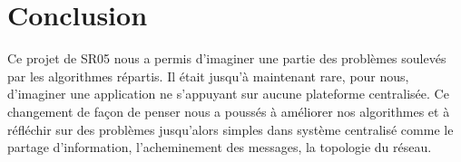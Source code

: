 \section{Conclusion}
Ce projet de SR05 nous a permis d'imaginer une partie des problèmes soulevés par les algorithmes répartis. Il était jusqu'à maintenant rare, pour nous, d'imaginer une application ne s'appuyant sur aucune plateforme centralisée. Ce changement de façon de penser nous a poussés à améliorer nos algorithmes et à réfléchir sur des problèmes jusqu'alors simples dans système centralisé comme le partage d'information, l'acheminement des messages, la topologie du réseau.

